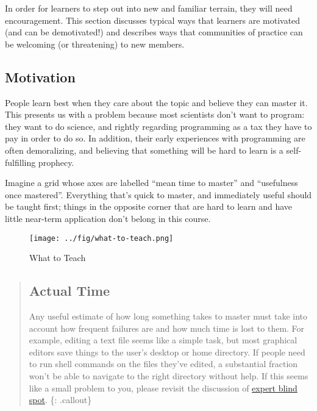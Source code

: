 
In order for learners to step out into new and familiar terrain, they
will need encouragement. This section discusses typical ways that
learners are motivated (and can be demotivated!) and describes ways that
communities of practice can be welcoming (or threatening) to new
members.

\subsection{Motivation}\label{motivation}

People learn best when they care about the topic and believe they can
master it. This presents us with a problem because most scientists don't
want to program: they want to do science, and rightly regarding
programming as a tax they have to pay in order to do so. In addition,
their early experiences with programming are often demoralizing, and
believing that something will be hard to learn is a self-fulfilling
prophecy.

Imagine a grid whose axes are labelled ``mean time to master'' and
``usefulness once mastered''. Everything that's quick to master, and
immediately useful should be taught first; things in the opposite corner
that are hard to learn and have little near-term application don't
belong in this course.

\begin{figure}[htbp]
\centering
\texttt{[image: ../fig/what-to-teach.png]}
\caption{What to Teach}
\end{figure}

\begin{quote}
\subsection{Actual Time}\label{actual-time}

Any useful estimate of how long something takes to master must take into
account how frequent failures are and how much time is lost to them. For
example, editing a text file seems like a simple task, but most
graphical editors save things to the user's desktop or home directory.
If people need to run shell commands on the files they've edited, a
substantial fraction won't be able to navigate to the right directory
without help. If this seems like a small problem to you, please revisit
the discussion of \href{\{\{\%20page.root\%20\}\}/08-memory/}{expert
blind spot}. \{: .callout\}
\end{quote}

